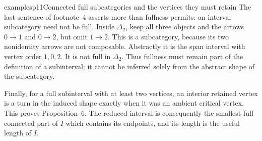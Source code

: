 \begin{dcomment}{examples}{p11}{Connected full subcategories and the vertices they must retain}
The last sentence of footnote~4 asserts more than fullness permits: an interval subcategory need not be full. Inside $\Delta_2$, keep all three objects and the arrows $0\to1$ and $0\to2$, but omit $1\to2$. This is a subcategory, because its two nonidentity arrows are not composable. Abstractly it is the span interval with vertex order $1,0,2$. It is not full in $\Delta_2$. Thus fullness must remain part of the definition of a subinterval; it cannot be inferred solely from the abstract shape of the subcategory.

Finally, for a full subinterval with at least two vertices, an interior retained vertex is a turn in the induced shape exactly when it was an ambient critical vertex. This proves Proposition~6. The reduced interval is consequently the smallest full connected part of $I$ which contains its endpoints, and its length is the useful length of $I$.
\end{dcomment}

